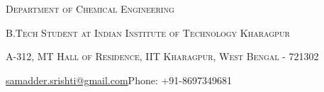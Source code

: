 \documentclass[a4paper,11pt]{extarticle} %
\begin{document}
\pagestyle{empty} %


\par{\par} %
\par{\centering\large {\textsc{Department of Chemical Engineering}}\par}\large
\par{\centering\large {\textsc{B.Tech Student at Indian Institute of Technology Kharagpur}}\par}\large
\par{\centering\large {\textsc{A-312, MT Hall of Residence, IIT Kharagpur, West Bengal - 721302}}\par}\large
\hspace{3.5cm}\normalsize {\href{mailto:samadder.srishti@gmail.com}{samadder.srishti@gmail.com}}\hfill{Phone: +91-8697349681}\hspace{3.5cm}

%

\end{document}
